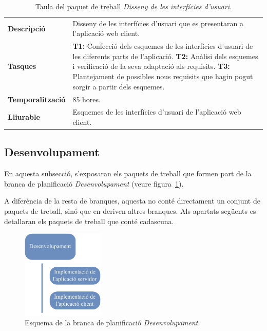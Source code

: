 \documentclass[a4paper,12pt]{ThesisStyle}
\begin{document}
\begin{table}[H]
  \begin{tabularx}{\textwidth}{l | X}
    \toprule
    \rowcolor{Green}
    \multicolumn{2}{c}{\texttt{\textbf{PT\_2.3:}} Disseny de les interfícies d'usuari}\\
    \midrule[0.9pt]
    \textbf{Descripció}       & Disseny de les interfícies d'usuari que es presentaran a l'aplicació web client.\\
    \midrule
    \textbf{Tasques}          & \textbf{T1:} Confecció dels esquemes de les interfícies d'usuari de les diferents parts de l'aplicació.
    \newline \textbf{T2:} Anàlisi dels esquemes i verificació de la seva adaptació als requisits.
    \newline \textbf{T3:} Plantejament de possibles nous requisits que hagin pogut sorgir a partir dels esquemes.\\
    \midrule
    \textbf{Temporalització}  & 85 hores.\\
    \midrule
    \textbf{Lliurable}        & Esquemes de les interfícies d'usuari de l'aplicació web client.\\
    \bottomrule
  \end{tabularx}
  \caption{\label{taula:pt_2.3} Taula del paquet de treball \emph{Disseny de les interfícies d'usuari}.}
\end{table}

\newpage

\subsection{Desenvolupament}
\label{subsec:desenvolupament}

En aquesta subsecció, s'exposaran els paquets de treball que formen part de la branca de planificació \emph{Desenvolupament} (veure figura~\ref{img:pt_desenvolupament}).

A diferència de la resta de branques, aquesta no conté directament un conjunt de paquets de treball, sinó que en deriven altres branques. Als apartats següents es detallaran els paquets de treball que conté cadascuna.

\begin{figure}[H]
	\centering
	\includegraphics[width=0.35\textwidth]{assets/working_packages/desenvolupament/general.pdf}
	\caption{\label{img:pt_desenvolupament}Esquema de la branca de planificació \emph{Desenvolupament}.}
\end{figure}
\end{document}
